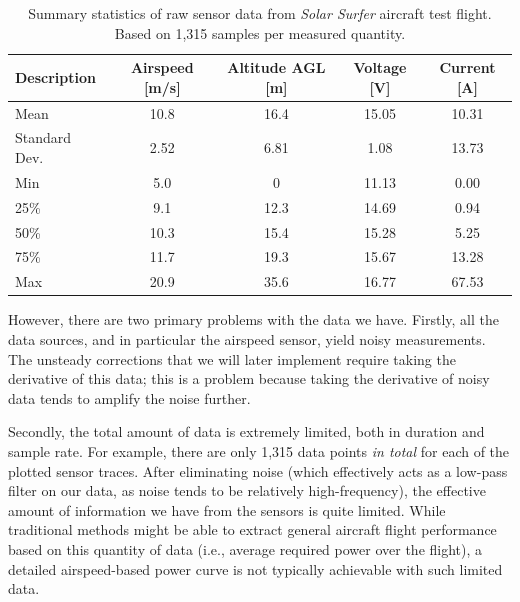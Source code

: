 \begin{table}[h]
    \centering
    \caption{Summary statistics of raw sensor data from \emph{Solar Surfer} aircraft test flight. Based on 1,315 samples per measured quantity.}
    \begin{tabular}{lcccc}
        \toprule
        Description   & Airspeed [m/s] & Altitude AGL [m] & Voltage [V] & Current [A] \\ \midrule
        Mean          & 10.8           & 16.4             & 15.05       & 10.31       \\
        Standard Dev. & 2.52           & 6.81             & 1.08        & 13.73       \\
        Min           & 5.0            & 0                & 11.13       & 0.00        \\
        25\%          & 9.1            & 12.3             & 14.69       & 0.94        \\
        50\%          & 10.3           & 15.4             & 15.28       & 5.25        \\
        75\%          & 11.7           & 19.3             & 15.67       & 13.28       \\
        Max           & 20.9           & 35.6             & 16.77       & 67.53       \\ \bottomrule
    \end{tabular}
    \label{tab:aircraft_stats}
\end{table}

However, there are two primary problems with the data we have. Firstly, all the data sources, and in particular the airspeed sensor, yield noisy measurements. The unsteady corrections that we will later implement require taking the derivative of this data; this is a problem because taking the derivative of noisy data tends to amplify the noise further.

Secondly, the total amount of data is extremely limited, both in duration and sample rate. For example, there are only 1,315 data points \emph{in total} for each of the plotted sensor traces. After eliminating noise (which effectively acts as a low-pass filter on our data, as noise tends to be relatively high-frequency), the effective amount of information we have from the sensors is quite limited. While traditional methods might be able to extract general aircraft flight performance based on this quantity of data (i.e., average required power over the flight), a detailed airspeed-based power curve is not typically achievable with such limited data.

